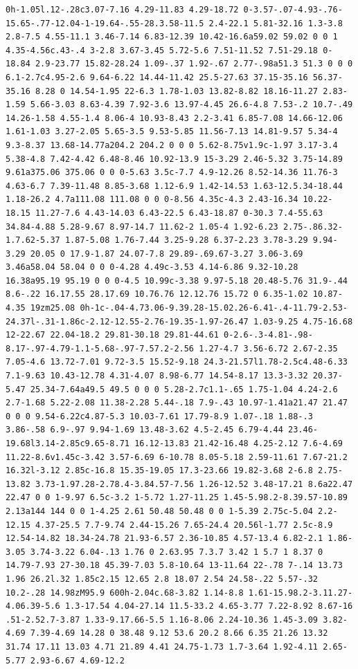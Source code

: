 \documentclass[11pt]{article}
\begin{document}
\begin{enumerate}
\begin{verbatim}
0h-1.05l.12-.28c3.07-7.16 4.29-11.83 4.29-18.72 0-3.57-.07-4.93-.76-15.65-.77-12.04-1-19.64-.55-28.3.58-11.5 2.4-22.1 5.81-32.16 1.3-3.8 2.8-7.5 4.55-11.1 3.46-7.14 6.83-12.39 10.42-16.6a59.02 59.02 0 0 1 4.35-4.56c.43-.4 3-2.8 3.67-3.45 5.72-5.6 7.51-11.52 7.51-29.18 0-18.84 2.9-23.77 15.82-28.24 1.09-.37 1.92-.67 2.77-.98a51.3 51.3 0 0 0 6.1-2.7c4.95-2.6 9.64-6.22 14.44-11.42 25.5-27.63 37.15-35.16 56.37-35.16 8.28 0 14.54-1.95 22-6.3 1.78-1.03 13.82-8.82 18.16-11.27 2.83-1.59 5.66-3.03 8.63-4.39 7.92-3.6 13.97-4.45 26.6-4.8 7.53-.2 10.7-.49 14.26-1.58 4.55-1.4 8.06-4 10.93-8.43 2.2-3.41 6.85-7.08 14.66-12.06 1.61-1.03 3.27-2.05 5.65-3.5 9.53-5.85 11.56-7.13 14.81-9.57 5.34-4 9.3-8.37 13.68-14.77a204.2 204.2 0 0 0 5.62-8.75v1.9c-1.97 3.17-3.4 5.38-4.8 7.42-4.42 6.48-8.46 10.92-13.9 15-3.29 2.46-5.32 3.75-14.89 9.61a375.06 375.06 0 0 0-5.63 3.5c-7.7 4.9-12.26 8.52-14.36 11.76-3 4.63-6.7 7.39-11.48 8.85-3.68 1.12-6.9 1.42-14.53 1.63-12.5.34-18.44 1.18-26.2 4.7a111.08 111.08 0 0 0-8.56 4.35c-4.3 2.43-16.34 10.22-18.15 11.27-7.6 4.43-14.03 6.43-22.5 6.43-18.87 0-30.3 7.4-55.63 34.84-4.88 5.28-9.67 8.97-14.7 11.62-2 1.05-4 1.92-6.23 2.75-.86.32-1.7.62-5.37 1.87-5.08 1.76-7.44 3.25-9.28 6.37-2.23 3.78-3.29 9.94-3.29 20.05 0 17.9-1.87 24.07-7.8 29.89-.69.67-3.27 3.06-3.69 3.46a58.04 58.04 0 0 0-4.28 4.49c-3.53 4.14-6.86 9.32-10.28 16.38a95.19 95.19 0 0 0-4.5 10.99c-3.38 9.97-5.18 20.48-5.76 31.9-.44 8.6-.22 16.17.55 28.17.69 10.76.76 12.12.76 15.72 0 6.35-1.02 10.87-4.35 19zm25.08 0h-1c-.04-4.73.06-9.39.28-15.02.26-6.41-.4-11.79-2.53-24.37l-.31-1.86c-2.12-12.55-2.76-19.35-1.97-26.47 1.03-9.25 4.75-16.68 12-22.67 22.04-18.2 29.81-30.18 29.81-44.61 0-2.6-.3-4.81-.98-8.17-.97-4.79-1.1-5.68-.97-7.57.2-2.56 1.27-4.7 3.56-6.72 2.67-2.35 7.05-4.6 13.72-7.01 9.72-3.5 15.52-9.18 24.3-21.57l1.78-2.5c4.48-6.33 7.1-9.63 10.43-12.78 4.31-4.07 8.98-6.77 14.54-8.17 13.3-3.32 20.37-5.47 25.34-7.64a49.5 49.5 0 0 0 5.28-2.7c1.1-.65 1.75-1.04 4.24-2.6 2.7-1.68 5.22-2.08 11.38-2.28 5.44-.18 7.9-.43 10.97-1.41a21.47 21.47 0 0 0 9.54-6.22c4.87-5.3 10.03-7.61 17.79-8.9 1.07-.18 1.88-.3 3.86-.58 6.9-.97 9.94-1.69 13.48-3.62 4.5-2.45 6.79-4.44 23.46-19.68l3.14-2.85c9.65-8.71 16.12-13.83 21.42-16.48 4.25-2.12 7.6-4.69 11.22-8.6v1.45c-3.42 3.57-6.69 6-10.78 8.05-5.18 2.59-11.61 7.67-21.2 16.32l-3.12 2.85c-16.8 15.35-19.05 17.3-23.66 19.82-3.68 2-6.8 2.75-13.82 3.73-1.97.28-2.78.4-3.84.57-7.56 1.26-12.52 3.48-17.21 8.6a22.47 22.47 0 0 1-9.97 6.5c-3.2 1-5.72 1.27-11.25 1.45-5.98.2-8.39.57-10.89 2.13a144 144 0 0 1-4.25 2.61 50.48 50.48 0 0 1-5.39 2.75c-5.04 2.2-12.15 4.37-25.5 7.7-9.74 2.44-15.26 7.65-24.4 20.56l-1.77 2.5c-8.9 12.54-14.82 18.34-24.78 21.93-6.57 2.36-10.85 4.57-13.4 6.82-2.1 1.86-3.05 3.74-3.22 6.04-.13 1.76 0 2.63.95 7.3.7 3.42 1 5.7 1 8.37 0 14.79-7.93 27-30.18 45.39-7.03 5.8-10.64 13-11.64 22-.78 7-.14 13.73 1.96 26.2l.32 1.85c2.15 12.65 2.8 18.07 2.54 24.58-.22 5.57-.32 10.2-.28 14.98zM95.9 600h-2.04c.68-3.82 1.14-8.8 1.61-15.98.2-3.11.27-4.06.39-5.6 1.3-17.54 4.04-27.14 11.5-33.2 4.65-3.77 7.22-8.92 8.67-16 .51-2.52.7-3.87 1.33-9.17.66-5.5 1.16-8.06 2.24-10.36 1.45-3.09 3.82-4.69 7.39-4.69 14.28 0 38.48 9.12 53.6 20.2 8.66 6.35 21.26 13.32 31.74 17.11 13.03 4.71 21.89 4.41 24.75-1.73 1.7-3.64 1.92-4.11 2.65-5.77 2.93-6.67 4.69-12.2 
\end{verbatim}
\end{enumerate}
\end{document}
